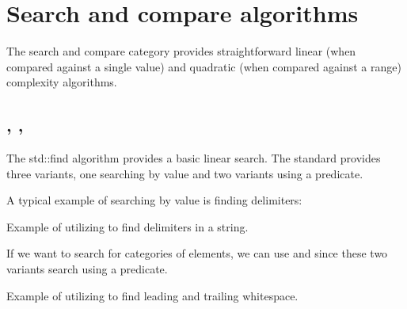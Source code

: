 \section{Search and compare algorithms}

The search and compare category provides straightforward linear (when compared against a single value) and quadratic (when compared against a range) complexity algorithms.

\subsection{\texorpdfstring{, , }{\texttt{std::find}, \texttt{std::find\_if}, \texttt{std::find\_if\_not}}}

The std::find algorithm provides a basic linear search. The standard provides three variants, one searching by value and two variants using a predicate.



A typical example of searching by value is finding delimiters:

\begin{box-note}
\footnotesize Example of utilizing  to find delimiters in a string.
\tcblower
{}
\end{box-note}

If we want to search for categories of elements, we can use  and  since these two variants search using a predicate.

\begin{box-note}
\footnotesize Example of utilizing  to find leading and trailing whitespace.
\tcblower
{}
\end{box-note}

\subsection{\texorpdfstring{}{\texttt{std::adjacent\_find}}}

